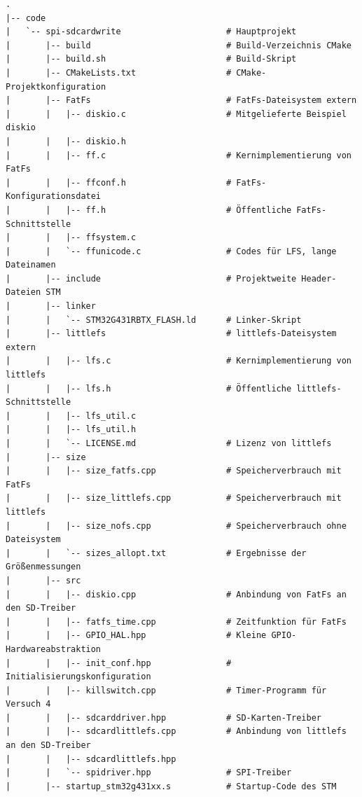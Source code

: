 \documentclass[11pt]{article}
\begin{document}
\begin{verbatim}
.
|-- code
|   `-- spi-sdcardwrite                     # Hauptprojekt
|       |-- build                           # Build-Verzeichnis CMake
|       |-- build.sh                        # Build-Skript
|       |-- CMakeLists.txt                  # CMake-Projektkonfiguration
|       |-- FatFs                           # FatFs-Dateisystem extern
|       |   |-- diskio.c                    # Mitgelieferte Beispiel diskio 
|       |   |-- diskio.h
|       |   |-- ff.c                        # Kernimplementierung von FatFs
|       |   |-- ffconf.h                    # FatFs-Konfigurationsdatei
|       |   |-- ff.h                        # Öffentliche FatFs-Schnittstelle
|       |   |-- ffsystem.c
|       |   `-- ffunicode.c                 # Codes für LFS, lange Dateinamen
|       |-- include                         # Projektweite Header-Dateien STM
|       |-- linker
|       |   `-- STM32G431RBTX_FLASH.ld      # Linker-Skript
|       |-- littlefs                        # littlefs-Dateisystem extern
|       |   |-- lfs.c                       # Kernimplementierung von littlefs
|       |   |-- lfs.h                       # Öffentliche littlefs-Schnittstelle
|       |   |-- lfs_util.c
|       |   |-- lfs_util.h
|       |   `-- LICENSE.md                  # Lizenz von littlefs
|       |-- size
|       |   |-- size_fatfs.cpp              # Speicherverbrauch mit FatFs
|       |   |-- size_littlefs.cpp           # Speicherverbrauch mit littlefs
|       |   |-- size_nofs.cpp               # Speicherverbrauch ohne Dateisystem
|       |   `-- sizes_allopt.txt            # Ergebnisse der Größenmessungen
|       |-- src
|       |   |-- diskio.cpp                  # Anbindung von FatFs an den SD-Treiber
|       |   |-- fatfs_time.cpp              # Zeitfunktion für FatFs
|       |   |-- GPIO_HAL.hpp                # Kleine GPIO-Hardwareabstraktion
|       |   |-- init_conf.hpp               # Initialisierungskonfiguration
|       |   |-- killswitch.cpp              # Timer-Programm für Versuch 4
|       |   |-- sdcarddriver.hpp            # SD-Karten-Treiber
|       |   |-- sdcardlittlefs.cpp          # Anbindung von littlefs an den SD-Treiber
|       |   |-- sdcardlittlefs.hpp
|       |   `-- spidriver.hpp               # SPI-Treiber
|       |-- startup_stm32g431xx.s           # Startup-Code des STM

\end{verbatim}
\end{document}
